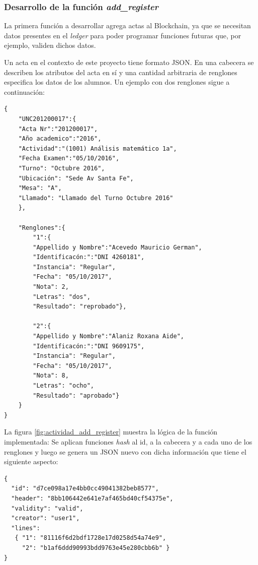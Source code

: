 \subsubsection{Desarrollo de la función \textit{add\_register}}
La primera función a desarrollar agrega actas al Blockchain, ya que se necesitan datos presentes en el \textit{ledger} para poder programar funciones futuras que, por ejemplo, validen dichos datos.

Un acta en el contexto de este proyecto tiene formato JSON. En una cabecera se describen los atributos del acta en sí y una cantidad arbitraria de renglones especifica los datos de los alumnos. Un ejemplo con dos renglones sigue a continuación:
\begin{verbatim}
{
    "UNC201200017":{
    "Acta Nr":"201200017",
    "Año academico":"2016",
    "Actividad":"(1001) Análisis matemático 1a",
    "Fecha Examen":"05/10/2016",
    "Turno": "Octubre 2016",
    "Ubicación": "Sede Av Santa Fe",
    "Mesa": "A",
    "Llamado": "Llamado del Turno Octubre 2016"
    },

    "Renglones":{
        "1":{
        "Appellido y Nombre":"Acevedo Mauricio German",
        "Identificacón:":"DNI 4260181",
        "Instancia": "Regular",
        "Fecha": "05/10/2017",
        "Nota": 2,
        "Letras": "dos",
        "Resultado": "reprobado"},

        "2":{
        "Appellido y Nombre":"Alaniz Roxana Aide",
        "Identificacón:":"DNI 9609175",
        "Instancia": "Regular",
        "Fecha": "05/10/2017",
        "Nota": 8,
        "Letras": "ocho",
        "Resultado": "aprobado"}
    }
}
\end{verbatim}
La figura \ref{fig:actividad_add_register} muestra la lógica de la función implementada: Se aplican funciones \textit{hash} al id, a la cabecera y a cada uno de los renglones y luego se genera un JSON nuevo con dicha información que tiene el siguiente aspecto: 
\begin{verbatim}
{
  "id": "d7ce098a17e4bb0cc49041382beb8577",
  "header": "8bb106442e641e7af465bd40cf54375e",
  "validity": "valid",
  "creator": "user1",
  "lines": 
   { "1": "81116f6d2bdf1728e17d0258d54a74e9",
     "2": "b1af6ddd90993bdd9763e45e280cbb6b" }
}
\end{verbatim}
